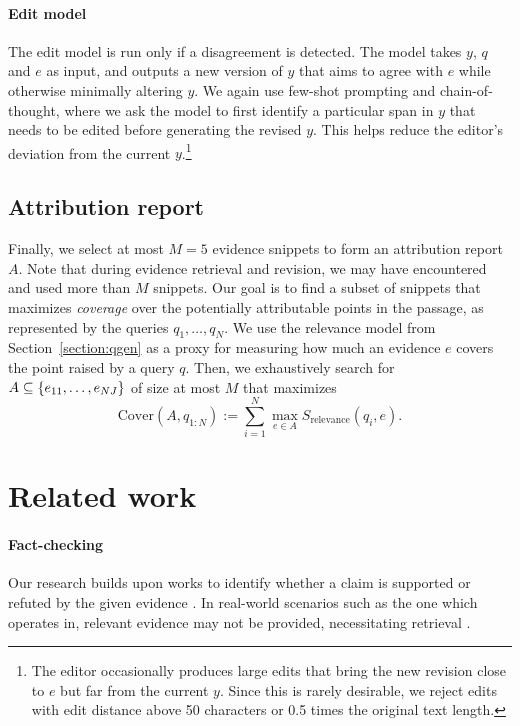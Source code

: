 \documentclass[11pt]{article}
\begin{document}
\paragraph{Edit model}
The edit model is run only if a disagreement is detected.
The model takes $y$, $q$ and $e$ as input, and outputs a new version of $y$ that aims to agree with $e$ while otherwise minimally altering $y$. We again use few-shot prompting and chain-of-thought, where we ask the model to first identify a particular span in $y$ that needs to be edited before generating the revised $y$. %
This helps reduce the editor's deviation from the current $y$.\footnote{The editor occasionally produces large edits that bring the new revision close to $e$ but far from the current $y$. Since this is rarely desirable, we reject edits with edit distance above 50 characters or 0.5 times the original text length.}


\subsection{Attribution report}\label{sec:attribution-report}

Finally, we select at most $M=5$ evidence snippets to form an attribution report $A$. Note that during evidence retrieval and revision, we may have encountered and used more than $M$ snippets.
Our goal is to find a subset of snippets that maximizes \emph{coverage} over the potentially attributable points in the passage, as represented by the queries ${q_1,\dots,q_N}$. We use the relevance model from Section~\ref{section:qgen} as a proxy for measuring how much an evidence $e$ covers the point raised by a query $q$. Then, we exhaustively search for $A \subseteq \{e_{11}, \dots, e_{NJ}\}$ of size at most $M$ that maximizes
\begin{equation}
\text{Cover}(A, q_{1:N}) := \sum_{i=1}^N \max_{e \in A} S_{\text{relevance}}(q_i, e).
\end{equation}



\section{Related work}\label{section:related}

\paragraph{Fact-checking}
Our research builds upon works to identify whether a claim is supported or refuted by the given evidence \cite{thorne2018fever, wang2017liar, karadzhov2017fully, augenstein2019multifc, wadden2020fact}. In real-world scenarios such as the one which \approach{} operates in, relevant evidence may not be provided, necessitating retrieval \cite{fan2020generating,piktus2021web}.
\end{document}
